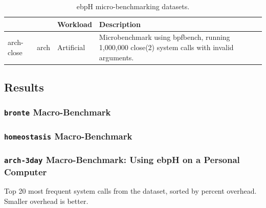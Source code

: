 \documentclass[
  12pt]{findlay}
\begin{document}
\begin{table}
\caption{ebpH micro-benchmarking datasets.}
\label{micro-datasets}
\begin{tabular}{>{\ttfamily}l>{\ttfamily}llp{2.3in}}
\toprule
\multicolumn{1}{l}{Dataset} & \multicolumn{1}{l}{System} & Workload & Description \\
\midrule
arch-close & arch & Artificial & Microbenchmark using bpfbench, running 1,000,000 close(2) system calls with invalid arguments. \\
\bottomrule
\end{tabular}
\end{table}

\hypertarget{results}{%
\subsection{Results}\label{results}}

\label{results-section}

\hypertarget{bronte-macro-benchmark}{%
\subsubsection{\texorpdfstring{\texttt{bronte}
Macro-Benchmark}{bronte Macro-Benchmark}}\label{bronte-macro-benchmark}}

\hypertarget{homeostasis-macro-benchmark}{%
\subsubsection{\texorpdfstring{\texttt{homeostasis}
Macro-Benchmark}{homeostasis Macro-Benchmark}}\label{homeostasis-macro-benchmark}}

\hypertarget{arch-3day-macro-benchmark-using-ebph-on-a-personal-computer}{%
\subsubsection{\texorpdfstring{\texttt{arch-3day} Macro-Benchmark: Using
ebpH on a Personal
Computer}{arch-3day Macro-Benchmark: Using ebpH on a Personal Computer}}\label{arch-3day-macro-benchmark-using-ebph-on-a-personal-computer}}

\begin{table}
    \caption{Top 20 most frequent system calls from the  dataset, sorted by percent overhead. Smaller
    overhead is better.}
\end{table}
\end{document}
